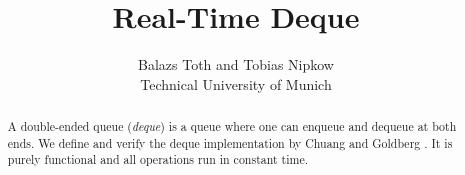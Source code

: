 \documentclass[11pt,a4paper]{article}
\begin{document}
\title{Real-Time Deque}
\author{Balazs Toth and Tobias Nipkow\\Technical University of Munich}
\maketitle

\begin{abstract}
A double-ended queue (\emph{deque}) is a queue where one can
enqueue and dequeue at both ends. We define and verify the deque
implementation by Chuang and Goldberg \cite{ChuangG93}. It is purely functional and all
operations run in constant time.
\end{abstract}

\tableofcontents





\end{document}
